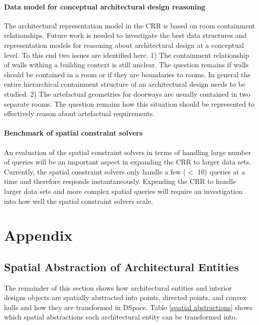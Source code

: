 \documentclass[12pt]{ucthesis}
\begin{document}
\subsubsection{Data model for conceptual architectural design reasoning}
The architectural representation model in the CRR is based on room containment relationships. Future work is needed to investigate the best data structures and representation models for reasoning about architectural design at a conceptual level. To this end two issues are identified here. 1) The containment relationship of walls withing a building context is still unclear. The question remains if walls should be contained in a room or if they are boundaries to rooms. In general the entire hierarchical containment structure of an architectural design needs to be studied. 2) The artefactual geometries for doorways are usually contained in two separate rooms. The question remains how this situation should be represented to effectively reason about artefactual requirements.

\subsubsection{Benchmark of spatial constraint solvers}
An evaluation of the spatial constraint solvers in terms of handling large number of queries will be an important aspect in expanding the CRR to larger data sets. Currently, the spatial constraint solvers only handle a few ($<$ 10) queries at a time and therefore responds instantaneously. Expending the CRR to handle larger data sets and more complex spatial queries will require an investigation into how well the spatial constraint solvers scale.


\appendix
\chapter{Appendix}
\section{Spatial Abstraction of Architectural Entities} \label{spatial abstraction}
The remainder of this section shows how architectural entities and interior designs objects are spatially abstracted into points, directed points, and convex hulls and how they are transformed in DSpace. Table \ref{spatial abstractions} shows which spatial abstractions each architectural entity can be transformed into. 
\end{document}
